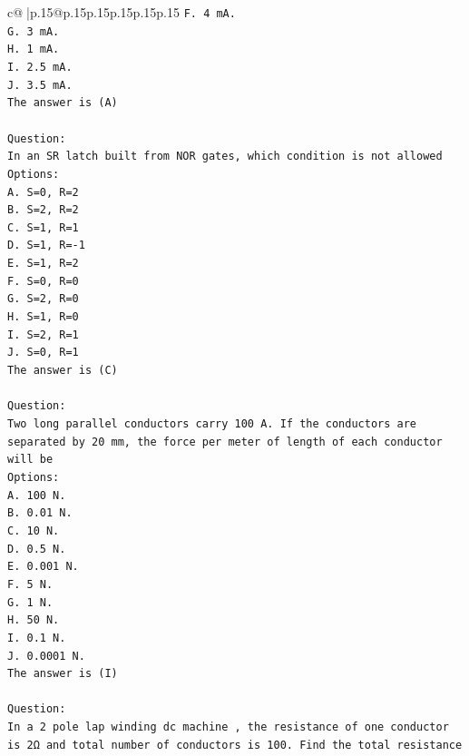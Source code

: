 \documentclass{article}
\begin{document}
{\begin{supertabular}{c@{$\;$}|p{.15\linewidth}@{}p{.15\linewidth}p{.15\linewidth}p{.15\linewidth}p{.15\linewidth}p{.15\linewidth}}
{{{\texttt{F. 4 mA.} \\
\texttt{G. 3 mA.} \\
\texttt{H. 1 mA.} \\
\texttt{I. 2.5 mA.} \\
\texttt{J. 3.5 mA.} \\
\texttt{The answer is (A)} \\
\\ 
\texttt{Question:} \\
\texttt{In an SR latch built from NOR gates, which condition is not allowed} \\
\texttt{Options:} \\
\texttt{A. S=0, R=2} \\
\texttt{B. S=2, R=2} \\
\texttt{C. S=1, R=1} \\
\texttt{D. S=1, R={-}1} \\
\texttt{E. S=1, R=2} \\
\texttt{F. S=0, R=0} \\
\texttt{G. S=2, R=0} \\
\texttt{H. S=1, R=0} \\
\texttt{I. S=2, R=1} \\
\texttt{J. S=0, R=1} \\
\texttt{The answer is (C)} \\
\\ 
\texttt{Question:} \\
\texttt{Two long parallel conductors carry 100 A. If the conductors are separated by 20 mm, the force per meter of length of each conductor will be} \\
\texttt{Options:} \\
\texttt{A. 100 N.} \\
\texttt{B. 0.01 N.} \\
\texttt{C. 10 N.} \\
\texttt{D. 0.5 N.} \\
\texttt{E. 0.001 N.} \\
\texttt{F. 5 N.} \\
\texttt{G. 1 N.} \\
\texttt{H. 50 N.} \\
\texttt{I. 0.1 N.} \\
\texttt{J. 0.0001 N.} \\
\texttt{The answer is (I)} \\
\\ 
\texttt{Question:} \\
\texttt{In a 2 pole lap winding dc machine , the resistance of one conductor is 2Ω and total number of conductors is 100. Find the total resistance} \\
}}}
\end{supertabular}}
\end{document}
